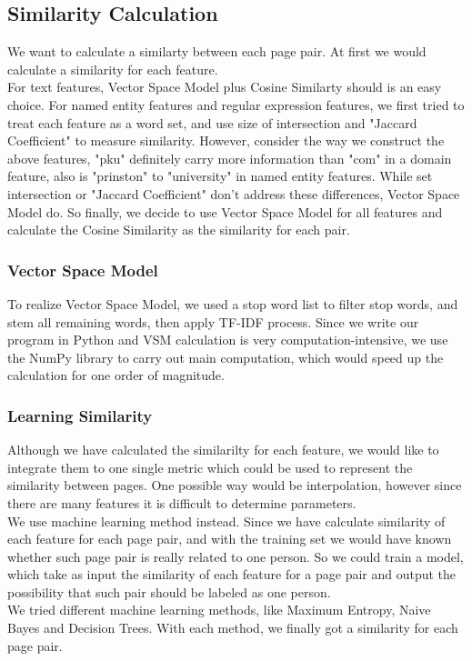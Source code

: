 \documentclass{article}
\begin{document}
\begin{CJK}{UTF8}{gbsn}
    \subsection{Similarity Calculation}
        We want to calculate a similarty between each page pair. 
        At first we would calculate a similarity for each feature. \\
        For text features, Vector Space Model plus Cosine Similarty should is an easy choice.
        For named entity features and regular expression features, we first tried to treat each feature as a word set, and use size of intersection and "Jaccard Coefficient" to measure similarity. 
        However, consider the way we construct the above features, "pku" definitely carry more information than "com" in a domain feature, also is "prinston" to "university" in named entity features.
        While set intersection or "Jaccard Coefficient" don't address these differences, Vector Space Model do.
        So finally, we decide to use Vector Space Model for all features and calculate the Cosine Similarity as the similarity for each pair.
        \subsubsection{Vector Space Model}
            To realize Vector Space Model, we used a  stop word list to filter stop words, and stem all remaining words, then apply TF-IDF process.
            Since we write our program in Python and VSM calculation is very computation-intensive, we use the NumPy library to carry out main computation, which would speed up the calculation for one order of magnitude.

        \subsubsection{Learning Similarity}
            Although we have calculated the similarilty for each feature, we would like to integrate them to one single metric which could be used to represent the similarity between pages. 
            One possible way would be interpolation, however since there are many features it is difficult to determine parameters. \\
            We use machine learning method instead. 
            Since we have calculate similarity of each feature for each page pair, and with the training set we would have known whether such page pair is really related to one person. 
            So we could train a model, which take as input the similarity of each feature for a page pair and output the possibility that such pair should be labeled as one person. \\
            We tried different machine learning methods, like Maximum Entropy, Naive Bayes and Decision Trees.
            With each method, we finally got a similarity for each page pair. 


\end{CJK}
\end{document}
